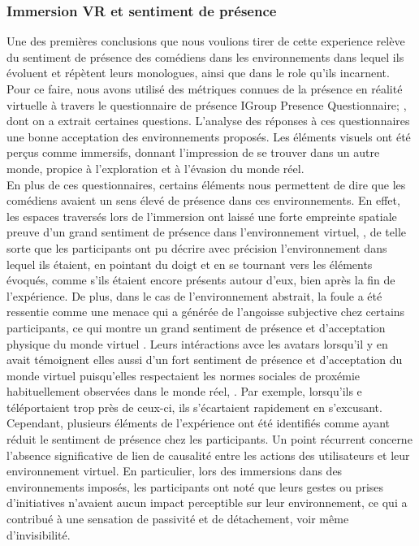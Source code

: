 \subsubsection{Immersion VR et sentiment de présence}
Une des premières conclusions que nous voulions tirer de cette experience relève du sentiment de présence
des comédiens dans les environnements dans lequel ils évoluent et répètent leurs monologues, ainsi que dans
le role qu'ils incarnent. Pour ce faire, nous avons utilisé des métriques connues de la présence en réalité virtuelle à travers
le questionnaire de présence IGroup Presence Questionnaire; \cite{Schubert}, dont on a extrait
certaines questions. 
L'analyse des réponses à ces questionnaires une bonne acceptation des environnements proposés. Les éléments
visuels ont été perçus comme immersifs, donnant l’impression de se trouver dans un autre monde, propice à 
l’exploration et à l’évasion du monde réel. 
\\
En plus de ces questionnaires, certains éléments nous permettent de dire que les comédiens avaient un sens 
élevé de présence dans ces environnements. En effet, les espaces traversés lors de l'immersion ont laissé une forte
empreinte spatiale preuve d'un grand sentiment de présence dans l'environnement virtuel, \cite{Khosravi}, de telle sorte que les participants ont pu décrire avec précision l'environnement dans lequel 
ils étaient, en pointant du doigt et en se tournant vers les éléments évoqués, comme s'ils étaient encore présents autour
d'eux, bien après la fin de l'expérience.  De plus, dans le cas de l'environnement abstrait, la foule a été ressentie comme
une menace qui a générée de l'angoisse subjective chez certains participants, ce qui montre un grand sentiment de présence
et d'acceptation physique du monde virtuel \cite{Zhang}. Leurs intéractions avce les avatars lorsqu'il y en avait témoignent elles aussi
d'un fort sentiment de présence et d'acceptation du monde virtuel puisqu'elles respectaient les normes sociales de proxémie 
habituellement observées dans le monde réel, \cite{Wilcox}. Par exemple, lorsqu'ils e téléportaient trop près de ceux-ci, 
ils s’écartaient rapidement en s’excusant. 
\\
Cependant, plusieurs éléments de l’expérience ont été identifiés comme ayant réduit le sentiment de présence chez les participants. 
Un point récurrent concerne l'absence significative de lien de causalité entre les actions des utilisateurs et leur environnement virtuel. 
En particulier, lors des immersions dans des environnements imposés, les participants ont noté que leurs gestes ou prises d’initiatives n’avaient 
aucun impact perceptible sur leur environnement, ce qui a contribué à une sensation de passivité et de détachement, voir même d'invisibilité. 

